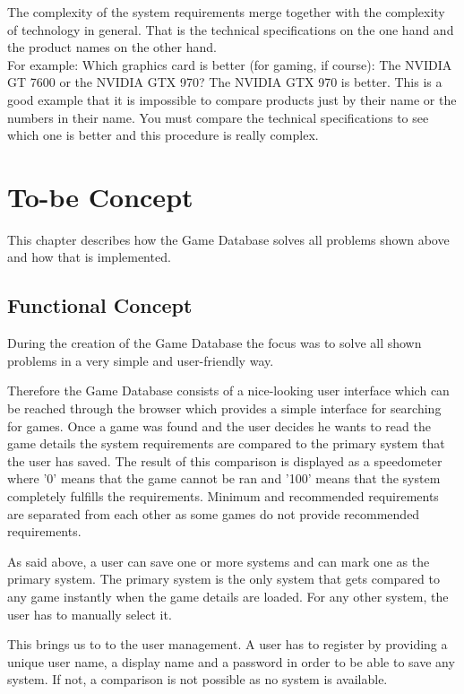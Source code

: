 \documentclass[12pt]{scrreprt}
\begin{document}
		The complexity of the system requirements merge together with the complexity of technology in general. That is the technical specifications on the one hand and the product names on the other hand.
		\\
		For example: Which graphics card is better (for gaming, if course): The NVIDIA GT 7600 or the NVIDIA GTX 970? The NVIDIA GTX 970 is better. This is a good example that it is impossible to compare products just by their name or the numbers in their name. You must compare the technical specifications to see which one is better and this procedure is really complex.



	\chapter{To-be Concept}
		\label{ch:tb-concept}

		This chapter describes how the Game Database solves all problems shown above and how that is implemented.

		\section{Functional Concept}
			\label{sec:tb-concept_functional}

			During the creation of the Game Database the focus was to solve all shown problems in a very simple and user-friendly way.

			Therefore the Game Database consists of a nice-looking user interface which can be reached through the browser which provides a simple interface for searching for games. Once a game was found and the user decides he wants to read the game details the system requirements are compared to the primary system that the user has saved. The result of this comparison is displayed as a speedometer where '0' means that the game cannot be ran and '100' means that the system completely fulfills the requirements. Minimum and recommended requirements are separated from each other as some games do not provide recommended requirements.

			As said above, a user can save one or more systems and can mark one as the primary system. The primary system is the only system that gets compared to any game instantly when the game details are loaded. For any other system, the user has to manually select it. 

			This brings us to to the user management. A user has to register by providing a unique user name, a display name and a password in order to be able to save any system. If not, a comparison is not possible as no system is available.
\end{document}
